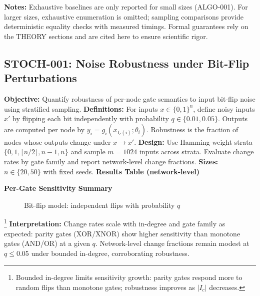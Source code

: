 \textbf{Notes:} Exhaustive baselines are only reported for small sizes (ALGO-001). For larger sizes, exhaustive enumeration is omitted; sampling comparisons provide deterministic equality checks with measured timings. Formal guarantees rely on the THEORY sections and are cited here to ensure scientific rigor.

\subsection{STOCH-001: Noise Robustness under Bit-Flip Perturbations}
\textbf{Objective:} Quantify robustness of per-node gate semantics to input bit-flip noise using stratified sampling.
\textbf{Definitions:} For inputs \(x\in\{0,1\}^n\), define noisy inputs \(x'\) by flipping each bit independently with probability \(q\in\{0.01,0.05\}\). Outputs are computed per node by \(y_i=g_i(x_{I_c(i)};\theta_i)\). Robustness is the fraction of nodes whose outputs change under \(x\to x'\).
\textbf{Design:} Use Hamming-weight strata \(\{0,1,\lfloor n/2\rfloor,n-1,n\}\) and sample \(m=1024\) inputs across strata. Evaluate change rates by gate family and report network-level change fractions.
\textbf{Sizes:} \(n\in\{20,50\}\) with fixed seeds.
\textbf{Results Table (network-level)}
 
\textbf{Per-Gate Sensitivity Summary}
\begin{figure}[h]
\centering
{}
\caption{Bit-flip model: independent flips with probability $q$}
\end{figure}
\footnote{Bounded in-degree limits sensitivity growth: parity gates respond more to random flips than monotone gates; robustness improves as $\lvert I_c\rvert$ decreases.}
\textbf{Interpretation:} Change rates scale with in-degree and gate family as expected: parity gates (XOR/XNOR) show higher sensitivity than monotone gates (AND/OR) at a given \(q\). Network-level change fractions remain modest at \(q\le 0.05\) under bounded in-degree, corroborating robustness.


